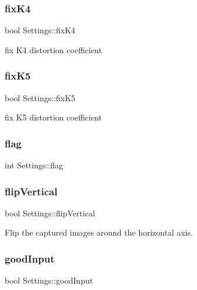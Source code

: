 \subsubsection{\texorpdfstring{fix\+K4}{fixK4}}
{\footnotesize\ttfamily bool Settings\+::fix\+K4}



fix K4 distortion coefficient 

\mbox{\label{class_settings_a4d0d37eef5f3033a8aabc3f09ee29a03}} 
\subsubsection{\texorpdfstring{fix\+K5}{fixK5}}
{\footnotesize\ttfamily bool Settings\+::fix\+K5}



fix K5 distortion coefficient 

\mbox{\label{class_settings_aba5691e3e76525f93ea254e654ec3717}} 
\subsubsection{\texorpdfstring{flag}{flag}}
{\footnotesize\ttfamily int Settings\+::flag}

\mbox{\label{class_settings_ab6304f260b315d2820f755e1c3a052b5}} 
\subsubsection{\texorpdfstring{flip\+Vertical}{flipVertical}}
{\footnotesize\ttfamily bool Settings\+::flip\+Vertical}



Flip the captured images around the horizontal axis. 

\mbox{\label{class_settings_a3b9fc27b555f982bd5b9ea5198e1f7e3}} 
\subsubsection{\texorpdfstring{good\+Input}{goodInput}}
{\footnotesize\ttfamily bool Settings\+::good\+Input}


